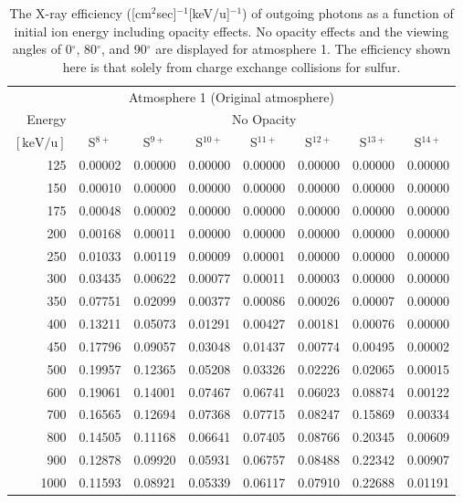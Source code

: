 \begin{longtable}{r|c|c|c|c|c|c|c}
    \caption{The X-ray efficiency ([cm$^2$sec]$^{-1}$[keV/u]$^{-1}$) of outgoing photons as a function of initial ion energy including opacity effects. No opacity effects and the viewing angles of 0$^\circ$, 80$^\circ$, and 90$^\circ$ are displayed for atmosphere 1. The efficiency shown here is that solely from charge exchange collisions for sulfur.}\\
    \multicolumn{8}{c}{Atmosphere 1 (Original atmosphere)} \\ \cline{2-8}
    Energy & \multicolumn{7}{c}{No Opacity} \\ \cline{2-8}
    $\mathrm{[keV/u]}$ & S$^{8+}$ & S$^{9+}$ & S$^{10+}$ & S$^{11+}$ & S$^{12+}$ & S$^{13+}$ & S$^{14+}$ \\ \cline{1-8}
      125 & 0.00002 & 0.00000 & 0.00000 & 0.00000 & 0.00000 & 0.00000 & 0.00000 \\
      150 & 0.00010 & 0.00000 & 0.00000 & 0.00000 & 0.00000 & 0.00000 & 0.00000 \\
      175 & 0.00048 & 0.00002 & 0.00000 & 0.00000 & 0.00000 & 0.00000 & 0.00000 \\
      200 & 0.00168 & 0.00011 & 0.00000 & 0.00000 & 0.00000 & 0.00000 & 0.00000 \\
      250 & 0.01033 & 0.00119 & 0.00009 & 0.00001 & 0.00000 & 0.00000 & 0.00000 \\
      300 & 0.03435 & 0.00622 & 0.00077 & 0.00011 & 0.00003 & 0.00000 & 0.00000 \\
      350 & 0.07751 & 0.02099 & 0.00377 & 0.00086 & 0.00026 & 0.00007 & 0.00000 \\
      400 & 0.13211 & 0.05073 & 0.01291 & 0.00427 & 0.00181 & 0.00076 & 0.00000 \\
      450 & 0.17796 & 0.09057 & 0.03048 & 0.01437 & 0.00774 & 0.00495 & 0.00002 \\
      500 & 0.19957 & 0.12365 & 0.05208 & 0.03326 & 0.02226 & 0.02065 & 0.00015 \\
      600 & 0.19061 & 0.14001 & 0.07467 & 0.06741 & 0.06023 & 0.08874 & 0.00122 \\
      700 & 0.16565 & 0.12694 & 0.07368 & 0.07715 & 0.08247 & 0.15869 & 0.00334 \\
      800 & 0.14505 & 0.11168 & 0.06641 & 0.07405 & 0.08766 & 0.20345 & 0.00609 \\
      900 & 0.12878 & 0.09920 & 0.05931 & 0.06757 & 0.08488 & 0.22342 & 0.00907 \\
     1000 & 0.11593 & 0.08921 & 0.05339 & 0.06117 & 0.07910 & 0.22688 & 0.01191 \\

\end{longtable}
